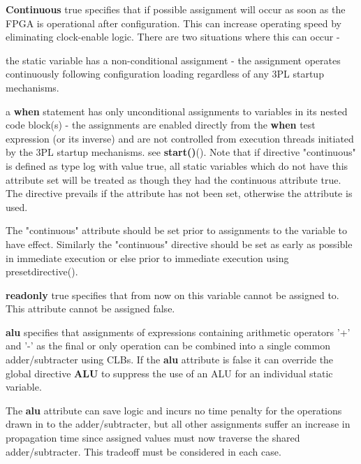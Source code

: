         {\bf Continuous} true specifies that if possible assignment will occur
        as soon as the FPGA is operational after configuration. This can
        increase operating speed by eliminating clock-enable logic. There are
        two situations where this can occur -
        \blist
        \item   the static variable has a non-conditional assignment - the
                assignment operates continuously following configuration loading
                regardless of any 3PL startup mechanisms.
        \item   a {\bf when} statement has only unconditional assignments to
                variables in its nested code block(s) - the assignments are
                enabled directly from the {\bf when} test expression (or its
                inverse) and are not controlled from execution threads
                initiated by the 3PL startup mechanisms.
        \blend
        see {\bf start()}().
        Note that if directive "continuous" is defined as type log with value
        true, all static variables which do
        not have this attribute set will be treated as though they had the
        continuous attribute true. The directive prevails if the attribute has
        not been set, otherwise the attribute is used.
        
        The "continuous" attribute should be set prior to assignments to the
        variable to have effect. Similarly the "continuous" directive should
        be set as early as possible in immediate execution or else prior
        to immediate execution using presetdirective().

        {\bf readonly} true specifies that from now on this variable cannot
        be assigned to. This attribute cannot be assigned false.
        
        {\bf alu} specifies that assignments of expressions containing
        arithmetic operators '+' and '-' as the final or only operation can be
        combined into a single common adder/subtracter using CLBs. If the {\bf alu}
        attribute is false it can override the global directive {\bf ALU} to
        suppress the use of an ALU for an individual static variable.
        
        The {\bf alu} attribute can save logic and incurs no time penalty for the
        operations drawn in to the adder/subtracter, but all other assignments
        suffer an increase in propagation time since assigned values must now
        traverse the shared adder/subtracter. This tradeoff must be considered
        in each case.
        
